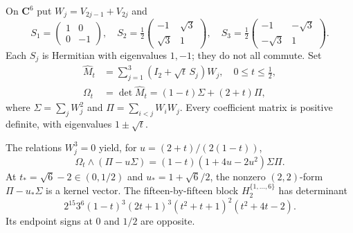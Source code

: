 \begin{example}
\label{ex:appH-Nakano-SD-six-dimensional}
On $\mathbf C^6$ put $W_j=V_{2j-1}+V_{2j}$ and
\[
 S_1=\begin{pmatrix}1&0\\0&-1\end{pmatrix},\quad
 S_2=\tfrac12\begin{pmatrix}-1&\sqrt3\\\sqrt3&1\end{pmatrix},\quad
 S_3=\tfrac12\begin{pmatrix}-1&-\sqrt3\\-\sqrt3&1\end{pmatrix}.
\]
Each $S_j$ is Hermitian with eigenvalues $1,-1$; they do
not all commute. Set
\begin{equation*}
 \begin{aligned}
 \widehat M_t&=\sum_{j=1}^3(I_2+\sqrt t\,S_j)W_j,
 \quad 0\leq t\leq\tfrac12,\\
 \Omega_t&=\det\widehat M_t=(1-t)\Sigma+(2+t)\Pi,
 \end{aligned}
 \tag{H.93}\label{eq:appH-Nakano-SD-seed}
\end{equation*}
where $\Sigma=\sum_jW_j^2$ and
$\Pi=\sum_{i<j}W_iW_j$. Every coefficient matrix is
positive definite, with eigenvalues $1\pm\sqrt t$.

The relations $W_j^3=0$ yield, for
$u=(2+t)/(2(1-t))$,
\begin{equation*}
 \Omega_t\wedge(\Pi-u\Sigma)
       =(1-t)(1+4u-2u^2)\Sigma\Pi.
 \tag{H.94}\label{eq:appH-Nakano-SD-explicit-kernel}
\end{equation*}
At $t_*=\sqrt6-2\in(0,1/2)$ and
$u_*=1+\sqrt6/2$, the nonzero $(2,2)$-form
$\Pi-u_*\Sigma$ is a kernel vector.
The fifteen-by-fifteen block $H_2^{\{1,\ldots,6\}}$
has determinant
\begin{equation*}
 2^{15}3^6(1-t)^3(2t+1)^3(t^2+t+1)^2(t^2+4t-2).
 \tag{H.95}\label{eq:appH-Nakano-SD-determinant-factor}
\end{equation*}
Its endpoint signs at $0$ and $1/2$ are opposite.
\end{example}

